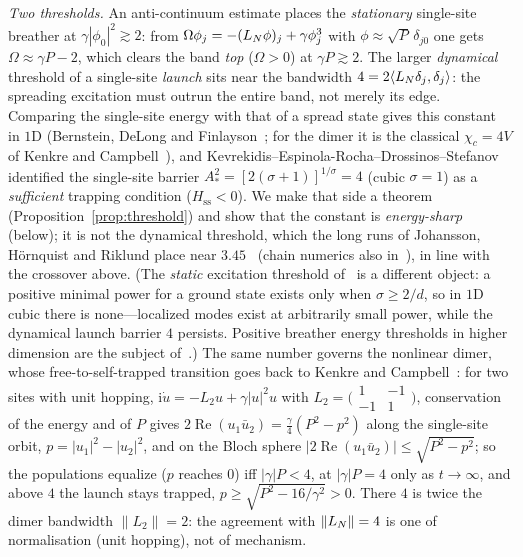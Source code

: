 \emph{Two thresholds.} An anti-continuum estimate places the \emph{stationary} single-site breather at
$\gamma|\phi_0|^2\gtrsim2$: from $\Omega\phi_j=-(L_N\phi)_j+\gamma\phi_j^3$ with $\phi\approx\sqrt P\,\delta_{j0}$
one gets $\Omega\approx\gamma P-2$, which clears the band \emph{top} ($\Omega>0$) at $\gamma P\gtrsim2$. The
larger \emph{dynamical} threshold of a single-site \emph{launch} sits near the bandwidth
$4=2\langle L_N\delta_j,\delta_j\rangle$: the spreading excitation must outrun the entire band, not merely its
edge. Comparing the single-site energy with that of a spread state gives this constant in $1$D
(Bernstein, DeLong and Finlayson~\cite{BDF93}; for the dimer it is the classical $\chi_c=4V$ of Kenkre and
Campbell~\cite{KenkreCampbell}), and Kevrekidis--Espinola-Rocha--Drossinos--Stefanov~\cite{KERDS08}
identified the single-site barrier $A_*^2=[2(\sigma+1)]^{1/\sigma}=4$ (cubic $\sigma=1$) as a
\emph{sufficient} trapping condition ($H_{\mathrm{ss}}<0$). We make that side a theorem
(Proposition~\ref{prop:threshold}) and show that the constant is \emph{energy-sharp} (below); it is not the
dynamical threshold, which the long runs of Johansson, H\"ornquist and Riklund place near
$3.45$~\cite{JHR95} (chain numerics also in~\cite{MolinaTsironis}), in line with the crossover above.
(The \emph{static} excitation threshold of~\cite{Weinstein99} is a different object: a positive minimal
power for a ground state exists only when $\sigma\ge2/d$, so in $1$D cubic there is none---localized modes
exist at arbitrarily small power, while the dynamical launch barrier $4$ persists. Positive breather energy
thresholds in higher dimension are the subject of~\cite{FKM97}.) The same number governs
the nonlinear dimer, whose free-to-self-trapped transition goes back to Kenkre and Campbell~\cite{KC86}: for
two sites with unit hopping, $\mathrm i\dot u=-L_2u+\gamma|u|^2u$ with
$L_2=\bigl(\begin{smallmatrix}1&-1\\-1&1\end{smallmatrix}\bigr)$, conservation of the energy and of $P$ gives
$2\operatorname{Re}(u_1\bar u_2)=\tfrac\gamma4(P^2-p^2)$ along the single-site orbit, $p=|u_1|^2-|u_2|^2$, and on
the Bloch sphere $|2\operatorname{Re}(u_1\bar u_2)|\le\sqrt{P^2-p^2}$; so the populations equalize ($p$ reaches $0$) iff
$|\gamma|P<4$, at $|\gamma|P=4$ only as $t\to\infty$, and above $4$ the launch stays trapped, $p\ge\sqrt{P^2-16/\gamma^2}>0$. There $4$ is twice
the dimer bandwidth $\|L_2\|=2$: the agreement with $\|L_N\|=4$ is one of normalisation (unit hopping), not
of mechanism.

